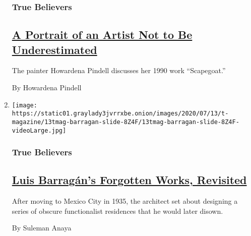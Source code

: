 \begin{enumerate}
  \hypertarget{true-believers-2}{%
  \subsubsection{True Believers}\label{true-believers-2}}

  \hypertarget{a-portrait-of-an-artist-not-to-be-underestimated}{%
  \subsection{\texorpdfstring{\href{/2020/07/24/t-magazine/howardena-pindell.html}{A
  Portrait of an Artist Not to Be
  Underestimated}}{A Portrait of an Artist Not to Be Underestimated}}\label{a-portrait-of-an-artist-not-to-be-underestimated}}

  The painter Howardena Pindell discusses her 1990 work ``Scapegoat.''

  By Howardena Pindell
\item
  \texttt{[image: https://static01.graylady3jvrrxbe.onion/images/2020/07/13/t-magazine/13tmag-barragan-slide-8Z4F/13tmag-barragan-slide-8Z4F-videoLarge.jpg]}

  \hypertarget{true-believers-3}{%
  \subsubsection{True Believers}\label{true-believers-3}}

  \hypertarget{luis-barraguxe1ns-forgotten-works-revisited}{%
  \subsection{\texorpdfstring{\href{/2020/07/24/t-magazine/luis-barragan.html}{Luis
  Barragán's Forgotten Works,
  Revisited}}{Luis Barragán's Forgotten Works, Revisited}}\label{luis-barraguxe1ns-forgotten-works-revisited}}

  After moving to Mexico City in 1935, the architect set about designing
  a series of obscure functionalist residences that he would later
  disown.

  By Suleman Anaya
\end{enumerate}

